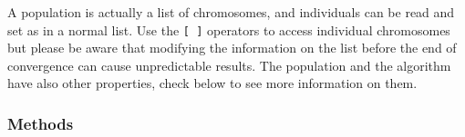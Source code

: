 A population is actually a list of chromosomes, and individuals can be
read and set as in a normal list. Use the \texttt{{[} {]}} operators to access
individual chromosomes but please be aware that modifying the information on
the list before the end of convergence can cause unpredictable results. The
population and the algorithm have also other properties, check below to see
more information on them.


  \subsubsection{Methods}

    \vspace{0.5ex}

